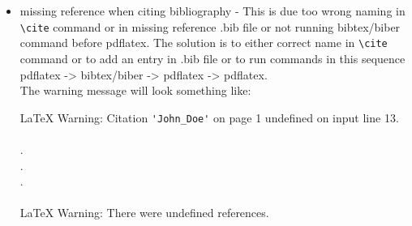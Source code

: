 \documentclass[a4paper,oneside,8pt]{extarticle}
\begin{document}
\begin{enumerate}
\begin{itemize}
            \item missing reference when citing bibliography - This is due too wrong naming in \verb|\cite| command or in missing reference .bib file or not running bibtex/biber command before pdflatex. The solution is to either correct name in \verb|\cite| command or to add an entry in .bib file or to run commands in this sequence pdflatex -> bibtex/biber -> pdflatex -> pdflatex.\\
            The warning message will look something like:\\
            \begin{markdown-block}
                LaTeX Warning: Citation \verb|'John_Doe'| on page 1 undefined on input line 13.\\
                \\
                .\\
                .\\
                .\\
                \\
                LaTeX Warning: There were undefined references.\\
                \\


\end{markdown-block}
\end{itemize}
\end{enumerate}
\end{document}
